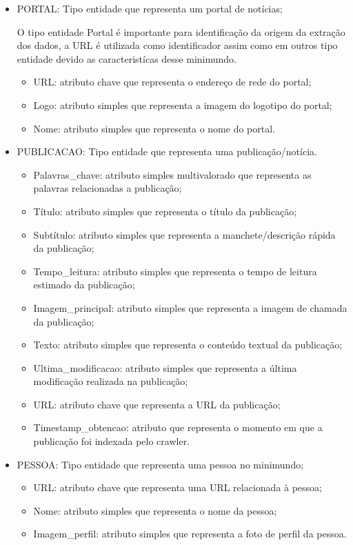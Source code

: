 \begin{itemize}

				\item PORTAL: Tipo entidade que representa um portal de notícias;

								O tipo entidade Portal é importante para identificação da origem da extração dos dados, a URL é utilizada como identificador assim como em outros tipo entidade devido as caracteristícas desse minimundo.
\begin{itemize}
\item URL: atributo chave que representa o endereço de rede do portal;
\item Logo: atributo simples que representa a imagem do logotipo do portal;
\item Nome: atributo simples que representa o nome do portal.
\end{itemize}
\end{itemize}
\begin{itemize}
\item PUBLICACAO: Tipo entidade que representa uma publicação/notícia.
\begin{itemize}
\item Palavras\_chave: atributo simples multivalorado que representa as palavras relacionadas a publicação;
\item Título: atributo simples que representa o título da publicação;
\item Subtítulo: atributo simples que representa a manchete/descrição rápida da publicação;
\item Tempo\_leitura: atributo simples que representa o tempo de leitura estimado da publicação;
\item Imagem\_principal: atributo simples que representa a imagem de chamada da publicação;
\item Texto: atributo simples que representa o conteúdo textual da publicação;
\item Ultima\_modificacao: atributo simples que representa a última modificação realizada na publicação;
\item URL: atributo chave que representa a URL da publicação;
\item Timestamp\_obtencao: atributo que representa o momento em que a publicação foi indexada pelo crawler.

\end{itemize}
\end{itemize}
\begin{itemize}

\item PESSOA: Tipo entidade que representa uma pessoa no minimundo;
\begin{itemize}
\item URL: atributo chave que representa uma URL relacionada à pessoa;
\item Nome: atributo simples que representa o nome da pessoa;
\item Imagem\_perfil: atributo simples que representa a foto de perfil da pessoa.
\end{itemize}
\end{itemize}
